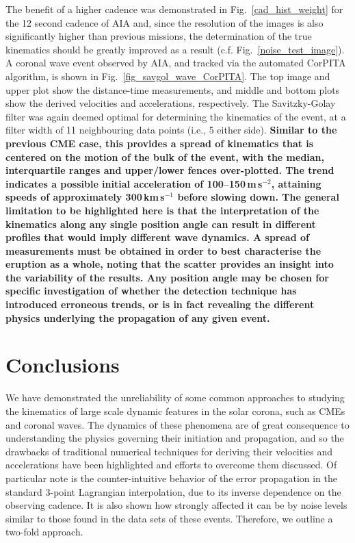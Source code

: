 \documentclass[structabstract]{aa}
\begin{document}
The benefit of a higher cadence was demonstrated in Fig.~\ref{cad_hist_weight} for the 12 second cadence of AIA and, since the resolution of the images is also significantly higher than previous missions, the determination of the true kinematics should be greatly improved as a result (c.f. Fig.~\ref{noise_test_image}). A coronal wave event observed by AIA, and tracked via the automated CorPITA algorithm, is shown in Fig.~\ref{fig_savgol_wave_CorPITA}. The top image and upper plot show the distance-time measurements, and middle and bottom plots show the derived velocities and accelerations, respectively. The Savitzky-Golay filter was again deemed optimal for determining the kinematics of the event, at a filter width of 11 neighbouring data points (i.e., 5 either side). {\bf Similar to the previous CME case, this provides a spread of kinematics that is centered on the motion of the bulk of the event, with the median, interquartile ranges and upper/lower fences over-plotted. The trend indicates a possible initial acceleration of 100--150\,m\,s$^{-2}$, attaining speeds of approximately 300\,km\,s$^{-1}$ before slowing down. The general limitation to be highlighted here is that the interpretation of the kinematics along any single position angle can result in different profiles that would imply different wave dynamics. A spread of measurements must be obtained in order to best characterise the eruption as a whole, noting that the scatter provides an insight into the variability of the results. Any position angle may be chosen for specific investigation of whether the detection technique has introduced erroneous trends, or is in fact revealing the different physics underlying the propagation of any given event.}


\section{Conclusions}
\label{sect:conclusions}

We have demonstrated the unreliability of some common approaches to studying the kinematics of large scale dynamic features in the solar corona, such as CMEs and coronal waves. The dynamics of these phenomena are of great consequence to understanding the physics governing their initiation and propagation, and so the drawbacks of traditional numerical techniques for deriving their velocities and accelerations have been highlighted and efforts to overcome them discussed. Of particular note is the counter-intuitive behavior of the error propagation in the standard 3-point Lagrangian interpolation, due to its inverse dependence on the observing cadence. It is also shown how strongly affected it can be by noise levels similar to those found in the data sets of these events. Therefore, we outline a two-fold approach.
\end{document}

